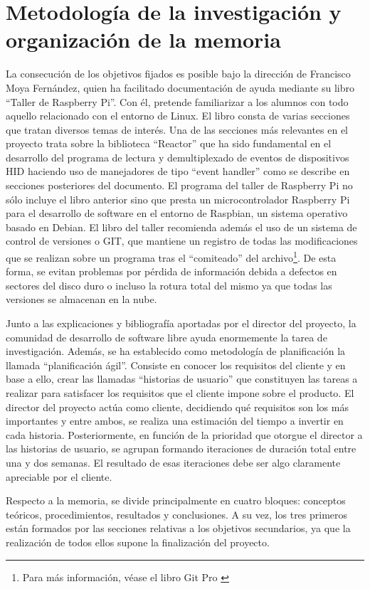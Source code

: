 \section{Metodología de la investigación y organización de la memoria} \label{s1_5}

La consecución de los objetivos fijados es posible bajo la dirección de Francisco Moya Fernández, quien ha facilitado documentación de ayuda mediante su libro ``Taller de Raspberry Pi''. Con él, pretende familiarizar a los alumnos con todo aquello relacionado con el entorno de Linux. El libro consta de varias secciones que tratan diversos temas de interés. Una de las secciones más relevantes en el proyecto trata sobre la biblioteca ``Reactor'' que ha sido fundamental en el desarrollo del programa de lectura y demultiplexado de eventos de dispositivos HID haciendo uso de manejadores de tipo ``event handler'' como se describe en secciones posteriores del documento. El programa del taller de Raspberry Pi no sólo incluye el libro anterior sino que presta un microcontrolador Raspberry Pi para el desarrollo de software en el entorno de Raspbian, un sistema operativo basado en Debian. El libro del taller recomienda además el uso de un sistema de control de versiones o GIT, que mantiene un registro de todas las modificaciones que se realizan sobre un programa tras el ``comiteado'' del archivo\footnote{Para más información, véase el libro Git Pro \citep{GIT}}. De esta forma, se evitan problemas por pérdida de información debida a defectos en sectores del disco duro o incluso la rotura total del mismo ya que todas las versiones se almacenan en la nube.

Junto a las explicaciones y bibliografía aportadas por el director del proyecto, la comunidad de desarrollo de software libre ayuda enormemente la tarea de investigación. Además, se ha establecido como metodología de planificación la llamada ``planificación ágil''. Consiste en conocer los requisitos del cliente y en base a ello, crear las llamadas ``historias de usuario'' que constituyen las tareas a realizar para satisfacer los requisitos que el cliente impone sobre el producto. El director del proyecto actúa como cliente, decidiendo qué requisitos son los más importantes y entre ambos, se realiza una estimación del tiempo a invertir en cada historia. Posteriormente, en función de la prioridad que otorgue el director a las historias de usuario, se agrupan formando iteraciones de duración total entre una y dos semanas. El resultado de esas iteraciones debe ser algo claramente apreciable por el cliente.

Respecto a la memoria, se divide principalmente en cuatro bloques: conceptos teóricos, procedimientos, resultados y conclusiones. A su vez, los tres primeros están formados por las secciones relativas a los objetivos secundarios, ya que la realización de todos ellos supone la finalización del proyecto.

